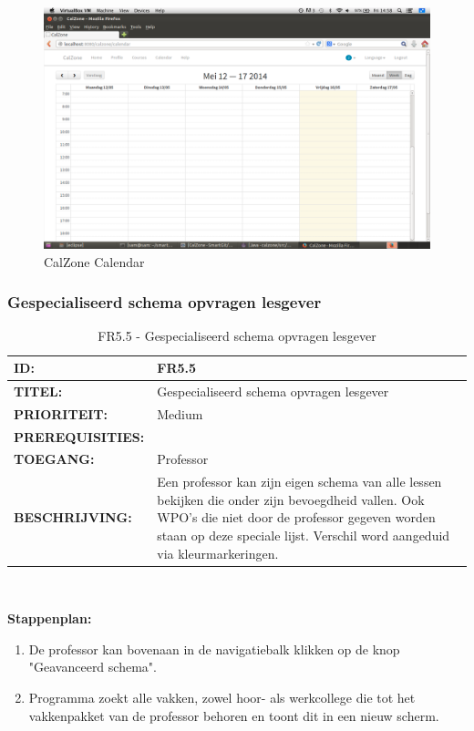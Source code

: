 \begin{center}
\begin{figure}[H]
\caption{CalZone Calendar}
\centerline{\includegraphics[scale=0.4]{img/CalzoneCalendar}}
\label{fig:CalZone Calendar}
\end{figure}
\end{center}


 
\subsubsection{Gespecialiseerd schema opvragen lesgever}       
\noindent\begin{table}[H]
            \begin{tabular}{l | p{10cm}}
                \textbf{ID:} & FR5.5 \\ \hline
                \textbf{TITEL:} & Gespecialiseerd schema opvragen lesgever\\ \hline
                \textbf{PRIORITEIT:} &  Medium \\ \hline
                \textbf{PREREQUISITIES:} & \\ \hline
                \textbf{TOEGANG:} & Professor \\ \hline
                \textbf{BESCHRIJVING:} & Een professor kan zijn eigen schema van alle lessen bekijken die onder zijn bevoegdheid vallen. Ook WPO's die niet door de professor gegeven worden staan op deze speciale lijst. Verschil word aangeduid via kleurmarkeringen. \\ 
            \end{tabular}\\
            \caption{FR5.5 - Gespecialiseerd schema opvragen lesgever}
            \label{tab:FR5.5 - Gespecializeerd schema opvragen lesgever}
        \end{table}
        
\textbf{Stappenplan:}
\begin{enumerate}
\item De professor kan bovenaan in de navigatiebalk klikken op de knop "Geavanceerd schema".
\item Programma zoekt alle vakken, zowel hoor- als werkcollege die tot het vakkenpakket van de professor behoren en toont dit in een nieuw scherm.
\end{enumerate}